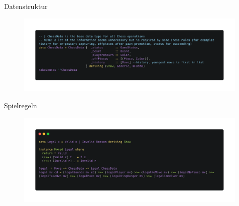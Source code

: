 \documentclass{beamer}
\begin{document}
\begin{frame}
\begin{columns}
\begin{figure}
\end{figure}

\end{columns}

\end{frame}



\begin{frame}{Datenstruktur}

\begin{figure}
\includegraphics[width=\linewidth]{chessdata}
\end{figure}

\end{frame}

\begin{frame}{Spielregeln}

\begin{figure}
\includegraphics[width=\linewidth]{chesslegal}
\end{figure}

\end{frame}
\end{document}
